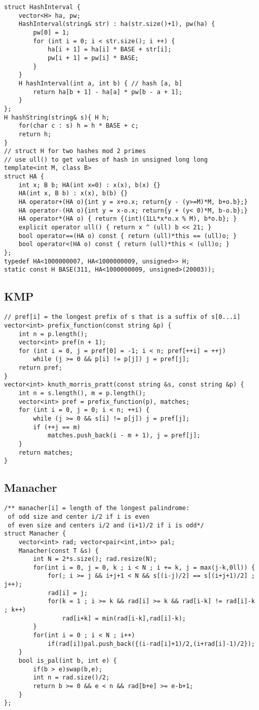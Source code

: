 \documentclass[landscape, 8pt, a4paper, oneside]{extarticle}
\begin{document}
\begin{multicols}{3}
\begin{verbatim}
struct HashInterval {
    vector<H> ha, pw;
    HashInterval(string& str) : ha(str.size()+1), pw(ha) {
        pw[0] = 1;
        for (int i = 0; i < str.size(); i ++) {
            ha[i + 1] = ha[i] * BASE + str[i];
            pw[i + 1] = pw[i] * BASE;
        }
    }
    H hashInterval(int a, int b) { // hash [a, b]
        return ha[b + 1] - ha[a] * pw[b - a + 1];
    }
};
H hashString(string& s){ H h;
    for(char c : s) h = h * BASE + c;
    return h;
}
// struct H for two hashes mod 2 primes
// use ull() to get values of hash in unsigned long long
template<int M, class B>
struct HA {
    int x; B b; HA(int x=0) : x(x), b(x) {}
    HA(int x, B b) : x(x), b(b) {}
    HA operator+(HA o){int y = x+o.x; return{y - (y>=M)*M, b+o.b};}
    HA operator-(HA o){int y = x-o.x; return{y + (y< 0)*M, b-o.b};}
    HA operator*(HA o) { return {(int)(1LL*x*o.x % M), b*o.b}; }
    explicit operator ull() { return x ^ (ull) b << 21; }
    bool operator==(HA o) const { return (ull)*this == (ull)o; }
    bool operator<(HA o) const { return (ull)*this < (ull)o; }
};
typedef HA<1000000007, HA<1000000009, unsigned>> H;
static const H BASE(311, HA<1000000009, unsigned>(20003));
\end{verbatim}
\subsection{KMP}
\begin{verbatim}
// pref[i] = the longest prefix of s that is a suffix of s[0...i]
vector<int> prefix_function(const string &p) {
    int n = p.length();
    vector<int> pref(n + 1);
    for (int i = 0, j = pref[0] = -1; i < n; pref[++i] = ++j)
        while (j >= 0 && p[i] != p[j]) j = pref[j];
    return pref;
}
vector<int> knuth_morris_pratt(const string &s, const string &p) {
    int n = s.length(), m = p.length();
    vector<int> pref = prefix_function(p), matches;
    for (int i = 0, j = 0; i < n; ++i) {
        while (j >= 0 && s[i] != p[j]) j = pref[j];
        if (++j == m)
            matches.push_back(i - m + 1), j = pref[j];
    }
    return matches;
}
\end{verbatim}
\subsection{Manacher}
\begin{verbatim}
/** manacher[i] = length of the longest palindrome:
 of odd size and center i/2 if i is even
 of even size and centers i/2 and (i+1)/2 if i is odd*/
struct Manacher {
    vector<int> rad; vector<pair<int,int>> pal;
    Manacher(const T &s) {
        int N = 2*s.size(); rad.resize(N);
        for(int i = 0, j = 0, k ; i < N ; i += k, j = max(j-k,0ll)) {
            for(; i >= j && i+j+1 < N && s[(i-j)/2] == s[(i+j+1)/2] ; j++);
            rad[i] = j;
            for(k = 1 ; i >= k && rad[i] >= k && rad[i-k] != rad[i]-k ; k++)
                rad[i+k] = min(rad[i-k],rad[i]-k);
        }
        for(int i = 0 ; i < N ; i++)
            if(rad[i])pal.push_back({(i-rad[i]+1)/2,(i+rad[i]-1)/2});
    }
    bool is_pal(int b, int e) {
        if(b > e)swap(b,e);
        int n = rad.size()/2;
        return b >= 0 && e < n && rad[b+e] >= e-b+1;
    }
};
\end{verbatim}

\end{multicols}
\end{document}
